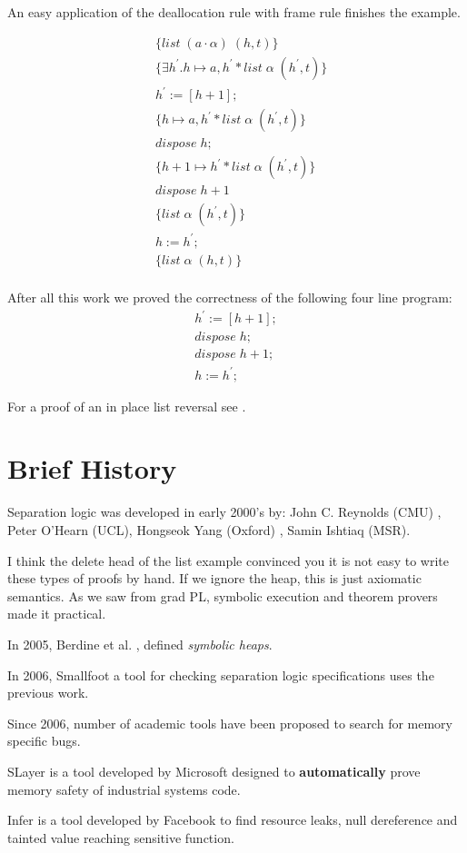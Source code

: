 \documentclass[12pt]{article}
\begin{document}
An easy application of the deallocation rule with frame rule finishes the example.

\begin{align*}
&\{list \; (a\cdot\alpha) \; (h,t)\}\\
&\{\exists h^\prime.h\mapsto a,h^\prime * list \; \alpha \; (h^\prime,t)\}\\
&h^\prime:=[h+1];\\
&\{h\mapsto a,h^\prime * list \; \alpha \; (h^\prime,t)\}\\
&dispose \; h;\\
&\{h+1\mapsto h^\prime * list \; \alpha \; (h^\prime,t)\}\\
&dispose \; h+1\\
&\{list \; \alpha \; (h^\prime,t)\}\\
&h:=h^\prime;\\
&\{list \; \alpha \; (h,t)\}\\
\end{align*}

After all this work we proved the correctness of the following four line program:
\begin{align*}
&h^\prime:=[h+1];\\
&dispose \; h;\\
&dispose \; h+1; &\\
&h:=h^\prime;
\end{align*}

For a proof of an in place list reversal see \cite{reynolds}.

\section{Brief History}
Separation logic was developed in early 2000's by: John C. Reynolds (CMU) \cite{reynolds}, Peter O'Hearn (UCL), Hongseok Yang (Oxford) \cite{ohearnintro}, Samin Ishtiaq (MSR).

I think the delete head of the list example convinced you it is not easy to write these types of proofs by hand. If we ignore the heap, this is just axiomatic semantics. As we saw from grad PL, symbolic execution and theorem provers made it practical.  

In 2005, Berdine et al. \cite{symbolic1} , defined \textit{symbolic heaps}.

In 2006, Smallfoot \cite{smalfoot1} a tool for checking separation logic specifications uses the previous work. 

Since 2006, number of academic tools have been proposed to search for memory specific bugs. 

SLayer \cite{slayer} is a tool developed by Microsoft designed to \textbf{automatically} prove memory safety of industrial systems code. 

Infer \cite{infer} is a tool developed by Facebook to find resource leaks, null dereference and tainted value reaching sensitive function.




\end{document}

